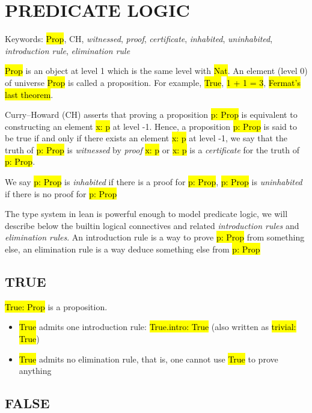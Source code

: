 \chapter{PREDICATE LOGIC}

Keywords: \hl{Prop}, CH, \textit{witnessed}, \textit{proof}, \textit{certificate}, \textit{inhabited}, \textit{uninhabited}, \textit{introduction rule}, \textit{elimination rule}

\hl{Prop} is an object at level 1 which is the same level with \hl{Nat}. An element (level 0) of universe \hl{Prop} is called a proposition. For example, \hl{True}, \hl{1 + 1 = 3}, \hl{Fermat's last theorem}.

Curry–Howard (CH) \cite{CH} asserts that proving a proposition \hl{p: Prop} is equivalent to constructing an element \hl{x: p} at level -1. Hence, a proposition \hl{p: Prop} is said to be true if and only if there exists an element  \hl{x: p} at level -1, we say that the truth of \hl{p: Prop} is \textit{witnessed} by \textit{proof} \hl{x: p} or \hl{x: p} is a \textit{certificate} for the truth of \hl{p: Prop}.

We say \hl{p: Prop} is \textit{inhabited} if there is a proof for \hl{p: Prop}, \hl{p: Prop} is \textit{uninhabited} if there is no proof for \hl{p: Prop}

The type system in lean is powerful enough to model predicate logic, we will describe below the builtin logical connectives and related \textit{introduction rules} and \textit{elimination rules}. An introduction rule is a way to prove \hl{p: Prop} from something else, an elimination rule is a way deduce something else from \hl{p: Prop}

\section{TRUE}

\hl{True: Prop} is a proposition.

\begin{itemize}
	\item \hl{True} admits one introduction rule: \hl{True.intro: True} (also written as \hl{trivial: True})
	
	\item \hl{True} admits no elimination rule, that is, one cannot use \hl{True} to prove anything
\end{itemize}


\section{FALSE}

